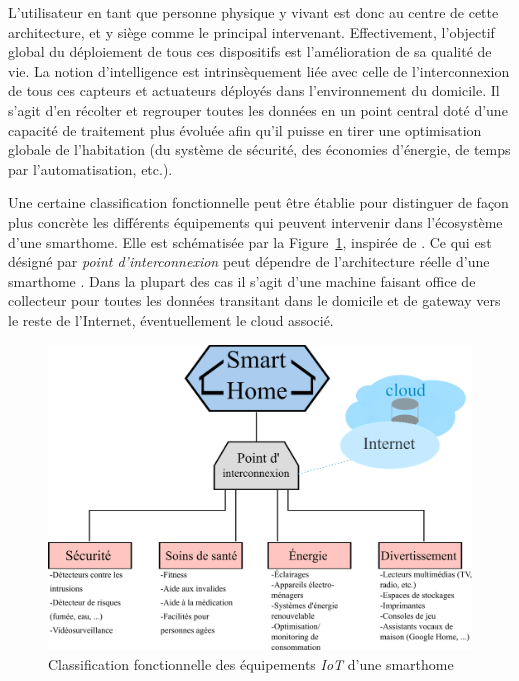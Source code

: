 \documentclass[]{article}
\begin{document}
\par L'utilisateur en tant que personne physique y vivant est donc au centre de cette architecture, et y siège comme le principal intervenant. Effectivement, l'objectif global du déploiement de tous ces dispositifs est l'amélioration de sa qualité de vie. La notion d'intelligence est intrinsèquement liée avec celle de l'interconnexion de tous ces capteurs et actuateurs déployés dans l'environnement du domicile. Il s'agit d'en récolter et regrouper toutes les données en un point central doté d'une capacité de traitement plus évoluée afin qu'il puisse en tirer une optimisation globale de l'habitation (du système de sécurité, des économies d'énergie, de temps par l'automatisation, etc.).\\

\par Une certaine classification fonctionnelle peut être établie pour distinguer de façon plus concrète les différents équipements qui peuvent intervenir dans l'écosystème d'une smarthome. Elle est schématisée par la Figure~\ref{sm_class}, inspirée de \cite{Basman2016}. Ce qui est désigné par \textit{point d'interconnexion} peut dépendre de l'architecture réelle d'une smarthome \cite{Huichen2016}. Dans la plupart des cas il s'agit d'une machine faisant office de collecteur pour toutes les données transitant dans le domicile et de gateway vers le reste de l'Internet, éventuellement le cloud associé.\\


\begin{figure}[!h]
\centering
\includegraphics[scale=1.3]{smarthome_class.png}
\caption{Classification fonctionnelle des équipements \textit{IoT} d'une smarthome}
\label{sm_class}
\end{figure}
\end{document}

